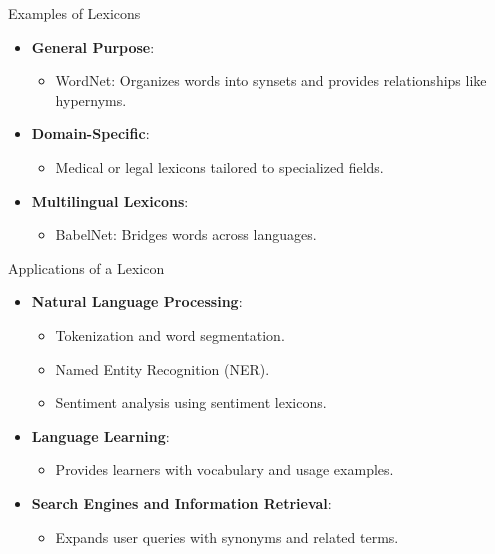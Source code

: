 \begin{frame}{Examples of Lexicons}
	\begin{itemize}
		\item \textbf{General Purpose}:
		\begin{itemize}
			\item WordNet: Organizes words into synsets and provides relationships like hypernyms.
		\end{itemize}
		\item \textbf{Domain-Specific}:
		\begin{itemize}
			\item Medical or legal lexicons tailored to specialized fields.
		\end{itemize}
		\item \textbf{Multilingual Lexicons}:
		\begin{itemize}
			\item BabelNet: Bridges words across languages.
		\end{itemize}
	\end{itemize}
\end{frame}

\begin{frame}{Applications of a Lexicon}
	\begin{itemize}
		\item \textbf{Natural Language Processing}:
		\begin{itemize}
			\item Tokenization and word segmentation.
			\item Named Entity Recognition (NER).
			\item Sentiment analysis using sentiment lexicons.
		\end{itemize}
		\item \textbf{Language Learning}:
		\begin{itemize}
			\item Provides learners with vocabulary and usage examples.
		\end{itemize}
		\item \textbf{Search Engines and Information Retrieval}:
		\begin{itemize}
			\item Expands user queries with synonyms and related terms.
		\end{itemize}
	\end{itemize}
\end{frame}

